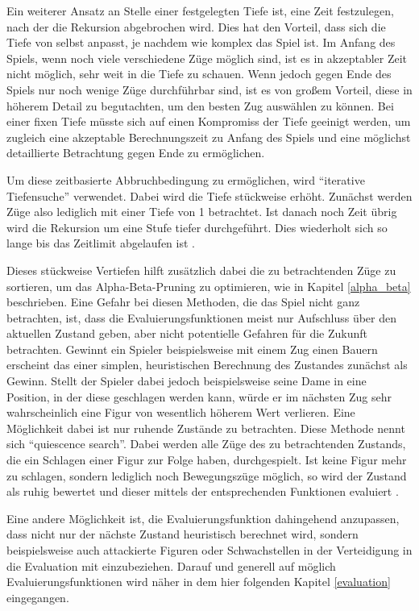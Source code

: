 Ein weiterer Ansatz an Stelle einer festgelegten Tiefe ist, eine Zeit festzulegen, nach der die Rekursion abgebrochen wird. Dies hat den Vorteil, dass sich die Tiefe von selbst anpasst, je nachdem wie komplex das Spiel ist. Im Anfang des Spiels, wenn noch viele verschiedene Züge möglich sind, ist es in akzeptabler Zeit nicht möglich, sehr weit in die Tiefe zu schauen. Wenn jedoch gegen Ende des Spiels nur noch wenige Züge durchführbar sind, ist es von großem Vorteil, diese in höherem Detail zu begutachten, um den besten Zug auswählen zu können. Bei einer fixen Tiefe müsste sich auf einen Kompromiss der Tiefe geeinigt werden, um zugleich eine akzeptable Berechnungszeit zu Anfang des Spiels und eine möglichst detaillierte Betrachtung gegen Ende zu ermöglichen.

Um diese zeitbasierte Abbruchbedingung zu ermöglichen, wird ``iterative Tiefensuche'' verwendet. Dabei wird die Tiefe stückweise erhöht. Zunächst werden Züge also lediglich mit einer Tiefe von 1 betrachtet. Ist danach noch Zeit übrig wird die Rekursion um eine Stufe tiefer durchgeführt. Dies wiederholt sich so lange bis das Zeitlimit abgelaufen ist \cite{Russell2010}.


Dieses stückweise Vertiefen hilft zusätzlich dabei die zu betrachtenden Züge zu sortieren, um das Alpha-Beta-Pruning zu optimieren, wie in Kapitel \ref{alpha_beta} beschrieben.
Eine Gefahr bei diesen Methoden, die das Spiel nicht ganz betrachten, ist, dass die Evaluierungsfunktionen meist nur Aufschluss über den aktuellen Zustand geben, aber nicht potentielle Gefahren für die Zukunft betrachten. Gewinnt ein Spieler beispielsweise mit einem Zug einen Bauern erscheint das einer simplen, heuristischen Berechnung des Zustandes zunächst als Gewinn. Stellt der Spieler dabei jedoch beispielsweise seine Dame in eine Position, in der diese geschlagen werden kann, würde er im nächsten Zug sehr wahrscheinlich eine Figur von wesentlich höherem Wert verlieren.
Eine Möglichkeit dabei ist nur ruhende Zustände zu betrachten. Diese Methode nennt sich ``quiescence search''. Dabei werden alle Züge des zu betrachtenden Zustands, die ein Schlagen einer Figur zur Folge haben, durchgespielt. Ist keine Figur mehr zu schlagen, sondern lediglich noch Bewegungszüge möglich, so wird der Zustand als ruhig bewertet und dieser mittels der entsprechenden Funktionen evaluiert \cite{Russell2010} \label{quiescence}.


Eine andere Möglichkeit ist, die Evaluierungsfunktion dahingehend anzupassen, dass nicht nur der nächste Zustand heuristisch berechnet wird, sondern beispielsweise auch attackierte Figuren oder Schwachstellen in der Verteidigung in die Evaluation mit einzubeziehen. Darauf und generell auf möglich Evaluierungsfunktionen wird näher in dem hier folgenden Kapitel \ref{evaluation} eingegangen.

